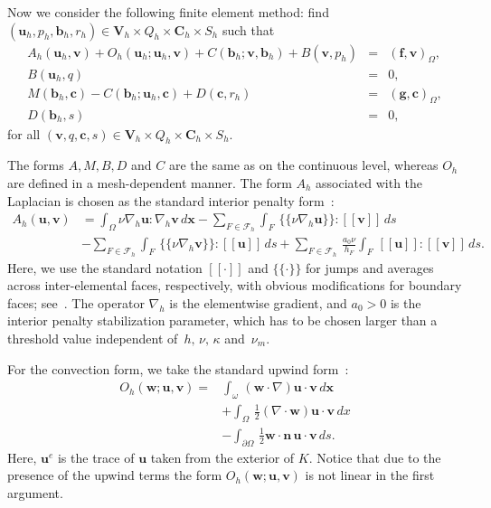 \documentclass{siamltex}
\newcommand{\uu}[1]{\boldsymbol #1}                     %
\newcommand{\jmp}[1]{[\![#1]\!]}                     %
\newcommand{\mvl}[1]{\{\!\!\{#1\}\!\!\}}             %
\begin{document}
Now we consider the following finite element method: find
$(\uu{u}_h,p_h,\uu{b}_h,r_h)\in \uu{V}_h\times Q_h\times \uu{C}_h\times S_h$ such that
\begin{subequations}
\label{eq:bn}
\begin{eqnarray}
\label{eq:bn1} A_h(\uu{u}_h,\uu{v}) +
O_h(\uu{u}_h;\uu{u}_h,\uu{v}) +C(\uu{b}_h;\uu{v},\uu{b}_h)
+B(\uu{v}, p_h) & = &
( \uu{f},\uu{v})_\Omega,\\[.1cm]
\label{eq:bn2}
B(\uu{u}_h,q)&=& 0, \\[.1cm]
\label{eq:bn3} M(\uu{b}_h,\uu{c})-C(\uu{b}_h;\uu{u}_h,\uu{c})+
D(\uu{c},r_h)&=& (\uu{g},\uu{c})_\Omega,\\[.1cm]
\label{eq:bn4} D(\uu{b}_h,s)&=&0,
\end{eqnarray}
\end{subequations}
for all $(\uu{v},q,\uu{c},s)\in \uu{V}_h\times Q_h \times \uu{C}_h\times S_h$.

The forms $A, M, B, D$ and $C$ are the same as on the continuous level, whereas $O_h$ are defined in a mesh-dependent manner.
The form $A_h$ associated with the Laplacian is chosen as the
standard interior penalty
form~\cite{Arnold82,ArnoldBrezziCockburnMarini2001}:
\begin{equation*}
\begin{split}
A_h(\uu{u},\uu{v})&=\int_{\Omega}\nu
\nabla_h\uu{u}:\nabla_h\uu{v}\,d\uu{x}- \sum_{F\in{\mathcal
F}_h}\int_{F}\,\mvl{\nu\nabla_h \uu{u}}:
\jmp{\uu{v}}\, ds\\[.1cm]
&-\sum_{F\in {\mathcal F}_h}\int _F\,\mvl{\nu\nabla_h \uu{v}}:
\jmp{\uu{u}}\,ds + \sum_{F\in{\mathcal F}_h} \,\frac{a_0\nu}{h_F}
\int_F\,\jmp{\uu{u}}: \jmp{\uu{v}}\, ds.
\end{split}
\end{equation*}
Here, we use the standard notation $\jmp{\cdot}$ and $\mvl{\cdot}$ for jumps and averages across inter-elemental faces, respectively, with obvious modifications for boundary faces; see~\cite{Greif10}. The operator $\nabla_h$ is the elementwise gradient, and $a_0>0$
is the interior penalty stabilization parameter, which has to be chosen
larger than a threshold value independent
of~$h,\,\nu,\,\kappa$ and~$\nu_m$.

For the convection form, we take
the standard upwind form~\cite{LesaintRaviart74}:
\begin{equation}
\label{eq:upwind-form}
\begin{split}
O_h(\uu{w};\uu{u},\uu{v})=&\int_{\omega}\,(\uu{w}\cdot\nabla)\uu{u}\cdot \uu{v}\,d\uu{x} \\
&+ \int_{\Omega}\, \frac12 (\nabla \cdot \uu{w})\uu{u}\cdot \uu{v} \, dx \\[.1cm]
&-\int_{\partial\Omega}\, \frac12\uu{w}\cdot\uu{n} \, \uu{u} \cdot \uu{v} \, ds.
\end{split}
\end{equation}
Here, $\uu{u}^e$ is the trace of $\uu{u}$ taken from the exterior of
$K$. Notice that due to the presence of the upwind terms the form
$O_h(\uu{w};\uu{u},\uu{v})$ is not linear in the first argument.
\end{document}

